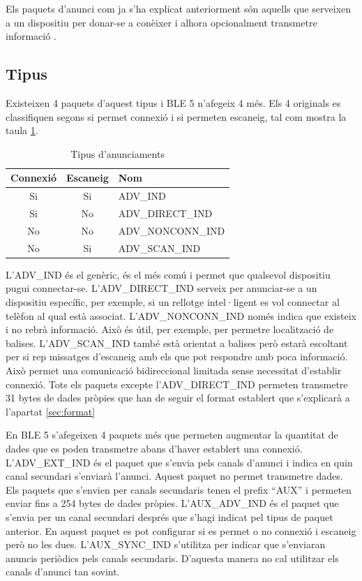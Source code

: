Els paquets d'anunci com ja s'ha explicat anteriorment són aquells que serveixen a un dispositiu per donar-se a conèixer i alhora opcionalment transmetre informació \cite{Advertising}.

\subsection{Tipus}
Existeixen 4 paquets d'aquest tipus i BLE 5 n'afegeix 4 més.
Els 4 originals es classifiquen segons si permet connexió i si permeten escaneig, tal com mostra la taula \ref{tab:Advertisment_Types}.

\begin{table}[!h]
	\begin{center}
		\begin{tabular}{|c|c|l|}
			\hline
			Connexió	&	Escaneig	&	Nom	\\	\hline
			Si			&	Si			&	ADV\_IND	\\	\hline
			Si			&	No			&	ADV\_DIRECT\_IND	\\	\hline
			No			&	No			&	ADV\_NONCONN\_IND	\\	\hline
			No			&	Si			&	ADV\_SCAN\_IND	\\	\hline
		\end{tabular}
	\end{center}
\caption{Tipus d'anunciaments}
\label{tab:Advertisment_Types}
\end{table}


L'ADV\_IND és el genèric, és el més comú i permet que qualsevol dispositiu pugui connectar-se.
L'ADV\_DIRECT\_IND serveix per anunciar-se a un dispositiu específic, per exemple, si un rellotge intel·ligent es vol connectar al telèfon al qual està associat.
L'ADV\_NONCONN\_IND només indica que existeix i no rebrà informació.
Això és útil, per exemple, per permetre localització de balises.
L'ADV\_SCAN\_IND també està orientat a balises però estarà escoltant per si rep missatges d'escaneig amb els que pot respondre amb poca informació.
Això permet una comunicació bidireccional limitada sense necessitat d'establir connexió.
Tots els paquets excepte l'ADV\_DIRECT\_IND permeten transmetre 31 bytes de dades pròpies que han de seguir el format establert que s'explicarà a l'apartat \ref{sec:format}

\label{Advertising_Extension_PDU}
En BLE 5 s'afegeixen 4 paquets més que permeten augmentar la quantitat de dades que es poden transmetre abans d'haver establert una connexió.
L'ADV\_EXT\_IND és el paquet que s'envia pels canals d'anunci i indica en quin canal secundari s'enviarà l'anunci. Aquest paquet no permet transmetre dades.
Els paquets que s'envien per canals secundaris tenen el prefix ``AUX'' i permeten enviar fins a 254 bytes de dades pròpies.
L'AUX\_ADV\_IND és el paquet que s'envia per un canal secundari després que s'hagi indicat pel tipus de paquet anterior.
En aquest paquet es pot configurar si es permet o no connexió i escaneig però no les dues.
L'AUX\_SYNC\_IND s'utilitza per indicar que s'enviaran anuncis periòdics pels canals secundaris.
D'aquesta manera no cal utilitzar els canals d'anunci tan sovint.

